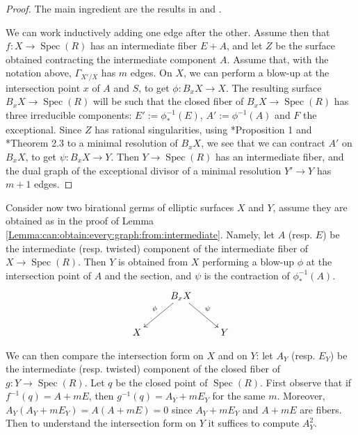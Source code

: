 \documentclass[11pt]{amsart}
\newcommand{\spec}{\operatorname{Spec}}
\theoremstyle{definition}
\begin{document}
 \begin{proof} The main ingredient are the results in \cite{Artinsing1} and
\cite{Artinsing2}.

We can work inductively adding one edge after the other.
Assume then that $f:X \to \spec(R)$ has an intermediate fiber $E+A$, and let $Z$ be the surface obtained contracting the intermediate component $A$.
Assume that, with the notation above, $\Gamma_{X'/X}$ has $m$ edges.
On $X$, we can perform a blow-up at
the intersection point $x$
of $A$ and $S$, to get $\phi:B_xX \to X$. The resulting surface $B_xX \to \spec(R)$ will be such that the closed fiber of $B_xX \to \spec(R)$ has three irreducible components:
$E':=\phi_*^{-1}(E)$, $A':=\phi^{-1}(A)$ and $F$ the exceptional. Since $Z$ has rational singularities, using \cite{Artinsing1}*{Proposition 1}
and \cite{Artinsing2}*{Theorem 2.3} to a minimal resolution of $B_xX$, we see that we can contract $A'$ on $B_xX$, to
get $\psi:B_xX \to Y$. Then
$Y \to \spec(R)$ has an intermediate fiber, and the dual graph of the exceptional divisor of a minimal resolution $Y' \to Y$ has $m+1$ edges. \end{proof}
Consider now two birational germs of elliptic surfaces $X$ and $Y$, assume they are obtained as in the proof of Lemma \ref{Lemma:can:obtain:every:graph:from:intermediate}. Namely, let $A$ (resp. $E$) be the intermediate (resp. twisted) component of the intermediate fiber of $X \to \spec(R)$. Then $Y$ is obtained from $X$ performing a blow-up $\phi$ at the intersection point of $A$ and the section, and $\psi$ is the contraction of $\phi^{-1}_*(A)$.
$$\xymatrix{ & B_xX \ar[ld]_{\phi} \ar[rd]^{\psi} & \\ X & &Y}$$

We can then compare the intersection form on $X$ and on $Y$: let $A_Y$ (resp. $E_Y$) be the intermediate (resp. twisted) component of
the closed fiber of $g:Y \to \spec(R)$. Let $q$ be the closed point of $\spec(R)$. First observe that if $f^{-1}(q)=A+mE$, then
$g^{-1}(q)=A_Y+mE_Y$ for the same $m$. Moreover, $A_Y(A_Y+mE_Y)=A(A+mE)=0$ since $A_Y+mE_Y$ and $A+mE$ are fibers.
Then to understand the intersection form on $Y$ it suffices to compute $A_Y^2$.
\end{document}
